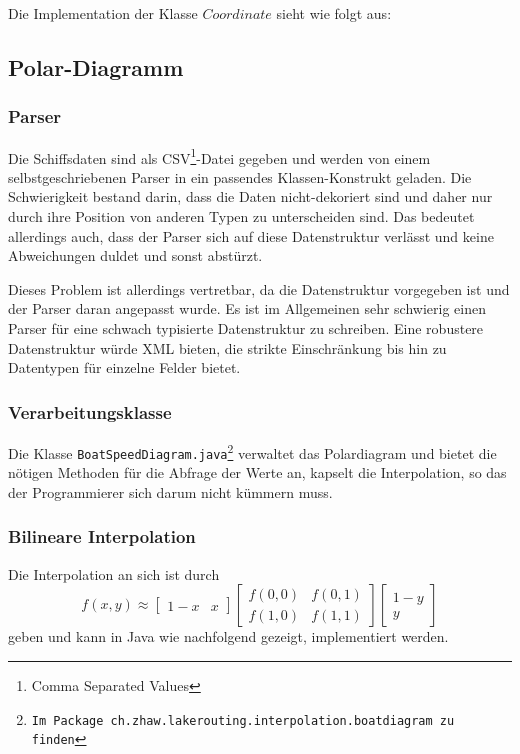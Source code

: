 Die Implementation der Klasse $Coordinate$ sieht wie folgt aus:




\subsection{Polar-Diagramm}
\subsubsection{Parser}
Die Schiffsdaten sind als CSV\footnote{Comma Separated Values}-Datei gegeben
und werden von einem selbst\-geschriebenen Parser in ein passendes
Klassen-Konstrukt geladen. Die Schwierigkeit bestand darin, dass die Daten
nicht-dekoriert sind und daher nur durch ihre Position von anderen Typen zu
unterscheiden sind. Das bedeutet allerdings auch, dass der Parser sich auf
diese Datenstruktur verlässt und keine Abweichungen duldet und sonst abstürzt.

Dieses Problem ist allerdings vertretbar, da die Datenstruktur vorgegeben ist
und der Parser daran angepasst wurde. Es ist im Allgemeinen sehr schwierig
einen Parser für eine schwach typisierte Datenstruktur zu schreiben. Eine
robustere Datenstruktur würde XML bieten, die strikte Einschränkung bis hin zu
Datentypen für einzelne Felder bietet.

\subsubsection{Verarbeitungsklasse}
Die Klasse \texttt{BoatSpeedDiagram.java\footnote{Im Package
ch.zhaw.lakerouting.interpolation.boatdiagram zu finden}} verwaltet das
Polardiagram und bietet die nötigen Methoden für die Abfrage der Werte an,
kapselt die Interpolation, so das der Programmierer sich darum nicht kümmern
muss.

\subsubsection{Bilineare Interpolation}\label{sss:bilinearinterpolation}
Die Interpolation an sich ist durch 
\begin{equation}
f(x,y) \approx \begin{bmatrix} 1-x & x \end{bmatrix} \begin{bmatrix}
f(0,0) & f(0,1) \\ f(1,0) & f(1,1) \end{bmatrix} \begin{bmatrix} 1 - y
\\ y \end{bmatrix}
\label{eq:bilineareinterpolation}
\end{equation}
geben und kann in Java wie nachfolgend gezeigt, implementiert werden.

